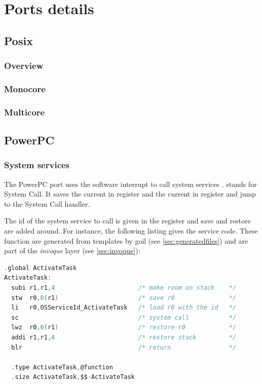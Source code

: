 
\chapter{Ports details}

\section{Posix}

\subsection{Overview}

\subsection{Monocore}

\subsection{Multicore}

\section{PowerPC}
\label{sec:ppcport}
\subsection{System services} \label{sec:systemservices}

The PowerPC port uses the  software interrupt to call system services \cite{mpc32bsc}.  stands for System Call. It saves the current  in  register and the current  in  register and jump to the System Call handler.

The id of the system service to call is given in the  register and  save and restore are added around. For instance, the following listing gives the  service code. These function are generated from templates by goil (see \ref{sec:generatedfiles}) and are part of the {\em invoque} layer (see \ref{sec:invoque}):

\begin{lstlisting}[language=C]
  .global ActivateTask
ActivateTask:
  subi r1,r1,4                       /* make room on stack    */
  stw  r0,0(r1)                      /* save r0               */
  li   r0,OSServiceId_ActivateTask   /* load r0 with the id   */
  sc                                 /* system call           */
  lwz  r0,0(r1)                      /* restore r0            */
  addi r1,r1,4                       /* restore stack         */
  blr                                /* return                */
  
  .type ActivateTask,@function
  .size ActivateTask,$$-ActivateTask
\end{lstlisting}

